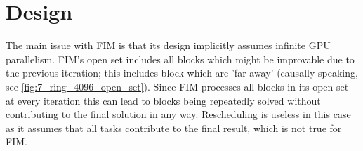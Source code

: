 \documentclass[11pt]{article}       %
\begin{document}
\section{Design} \label{sec:design}

The main issue with FIM is that its design implicitly assumes infinite GPU parallelism. FIM's open set includes all blocks which might be improvable due to the previous iteration; this includes block which are 'far away' (causally speaking, see \autoref{fig:7_ring_4096_open_set}). Since FIM processes all blocks in its open set at every iteration this can lead to blocks being repeatedly solved without contributing to the final solution in any way. Rescheduling is useless in this case as it assumes that all tasks contribute to the final result, which is not true for FIM.
\end{document}
